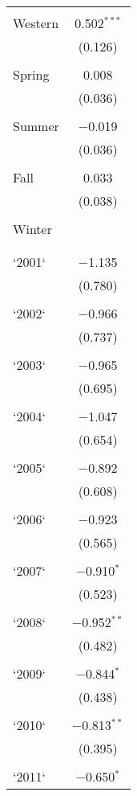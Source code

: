 \begin{table}[!htbp]
\begin{tabular}{@{\extracolsep{5pt}}lc}
  & \\ 
 Western & 0.502$^{***}$ \\ 
  & (0.126) \\ 
  & \\ 
 Spring & 0.008 \\ 
  & (0.036) \\ 
  & \\ 
 Summer & $-$0.019 \\ 
  & (0.036) \\ 
  & \\ 
 Fall & 0.033 \\ 
  & (0.038) \\ 
  & \\ 
 Winter &  \\ 
  &  \\ 
  & \\ 
 `2001` & $-$1.135 \\ 
  & (0.780) \\ 
  & \\ 
 `2002` & $-$0.966 \\ 
  & (0.737) \\ 
  & \\ 
 `2003` & $-$0.965 \\ 
  & (0.695) \\ 
  & \\ 
 `2004` & $-$1.047 \\ 
  & (0.654) \\ 
  & \\ 
 `2005` & $-$0.892 \\ 
  & (0.608) \\ 
  & \\ 
 `2006` & $-$0.923 \\ 
  & (0.565) \\ 
  & \\ 
 `2007` & $-$0.910$^{*}$ \\ 
  & (0.523) \\ 
  & \\ 
 `2008` & $-$0.952$^{**}$ \\ 
  & (0.482) \\ 
  & \\ 
 `2009` & $-$0.844$^{*}$ \\ 
  & (0.438) \\ 
  & \\ 
 `2010` & $-$0.813$^{**}$ \\ 
  & (0.395) \\ 
  & \\ 
 `2011` & $-$0.650$^{*}$ \\ 

\end{tabular}
\end{table}
